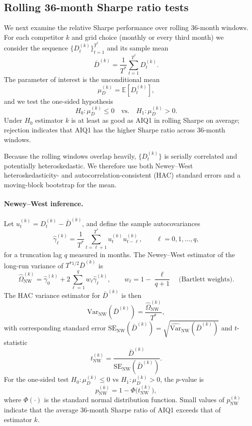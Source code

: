 \documentclass[12pt,letterpaper]{article}
\begin{document}
\subsection*{Rolling 36-month Sharpe ratio tests}

We next examine the relative Sharpe performance over rolling 36-month windows. For each competitor \(k\) and grid choice (monthly or every third month) we consider the sequence \(\{D_{t}^{(k)}\}_{t=1}^{T^{*}}\) and its sample mean
\[
\bar{D}^{(k)} = \frac{1}{T^{*}}\sum_{t=1}^{T^{*}} D_{t}^{(k)}.
\]
The parameter of interest is the unconditional mean
\[
\mu_{D}^{(k)} = \mathbb{E}[D_{t}^{(k)}],
\]
and we test the one-sided hypothesis
\[
H_{0}: \mu_{D}^{(k)} \le 0
\quad\text{vs.}\quad
H_{1}: \mu_{D}^{(k)} > 0.
\]
Under \(H_{0}\) estimator \(k\) is at least as good as AIQ1 in rolling Sharpe on average; rejection indicates that AIQ1 has the higher Sharpe ratio across 36-month windows.

Because the rolling windows overlap heavily, \(\{D_{t}^{(k)}\}\) is serially correlated and potentially heteroskedastic. We therefore use both Newey–West heteroskedasticity- and autocorrelation-consistent (HAC) standard errors and a moving-block bootstrap for the mean.

\paragraph{Newey–West inference.}  
Let \(u_{t}^{(k)} = D_{t}^{(k)} - \bar{D}^{(k)}\), and define the sample autocovariances
\[
\hat{\gamma}_{\ell}^{(k)} = \frac{1}{T^{*}}\sum_{t=\ell+1}^{T^{*}} u_{t}^{(k)} u_{t-\ell}^{(k)}, \qquad \ell = 0,1,\dots,q,
\]
for a truncation lag \(q\) measured in months. The Newey–West estimator of the long-run variance of \(T^{*1/2}\bar{D}^{(k)}\) is
\[
\widehat{\Omega}^{(k)}_{\text{NW}} 
= \hat{\gamma}_{0}^{(k)} + 2\sum_{\ell=1}^{q} w_{\ell}\hat{\gamma}_{\ell}^{(k)},
\qquad
w_{\ell} = 1 - \frac{\ell}{q+1}
\quad\text{(Bartlett weights)}.
\]
The HAC variance estimator for \(\bar{D}^{(k)}\) is then
\[
\widehat{\text{Var}}_{\text{NW}}(\bar{D}^{(k)}) = \frac{\widehat{\Omega}^{(k)}_{\text{NW}}}{T^{*}},
\]
with corresponding standard error \(\text{SE}_{\text{NW}}(\bar{D}^{(k)}) = \sqrt{\widehat{\text{Var}}_{\text{NW}}(\bar{D}^{(k)})}\) and \(t\)-statistic
\[
t^{(k)}_{\text{NW}} = \frac{\bar{D}^{(k)}}{\text{SE}_{\text{NW}}(\bar{D}^{(k)})}.
\]
For the one-sided test \(H_{0}:\mu_{D}^{(k)} \le 0\) vs \(H_{1}:\mu_{D}^{(k)} > 0\), the \(p\)-value is
\[
p^{(k)}_{\text{NW}} = 1 - \Phi\bigl(t^{(k)}_{\text{NW}}\bigr),
\]
where \(\Phi(\cdot)\) is the standard normal distribution function. Small values of \(p^{(k)}_{\text{NW}}\) indicate that the average 36-month Sharpe ratio of AIQ1 exceeds that of estimator \(k\).
\end{document}

